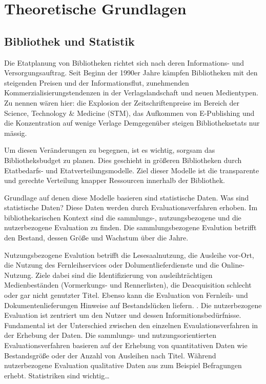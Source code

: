\chapter{Theoretische Grundlagen}
\label{chap:two}
\section{Bibliothek und Statistik}
\label{chap:two_one}
Die Etatplanung von Bibliotheken richtet sich nach deren Informations- und Versorgungsauftrag. 
Seit Beginn der 1990er Jahre kämpfen Bibliotheken mit den steigenden Preisen und der Informationsflut, 
zunehmenden Kommerzialisierungstendenzen in der Verlagslandschaft und neuen Medientypen. 
Zu nennen wären hier: die Explosion der Zeitschriftenpreise im Bereich der Science, Technology \& Medicine (STM),
das Aufkommen von E-Publishing und die Konzentration auf wenige Verlage Demgegenüber steigen Bibliotheksetats nur mässig. 
\cite[161]{moravetz-kuhlmann_monika_erwerbungspolitik_2015}

Um diesen Veränderungen zu begegnen, ist es wichtig, sorgsam das Bibliotheksbudget zu planen. 
Dies geschieht in größeren Bibliotheken durch Etatbedarfs- und Etatverteilungsmodelle. 
Ziel dieser Modelle ist die transparente und gerechte Verteilung knapper Ressourcen innerhalb der Bibliothek. 
\cite[172]{moravetz-kuhlmann_monika_erwerbungspolitik_2015}

Grundlage auf denen diese Modelle basieren sind statistische Daten. Was sind statistische Daten? Diese Daten werden durch Evaluationsverfahren erhoben. 
Im bibliothekarischen Kontext sind die sammlungs-, nutzungsbezogene und die nutzerbezogene Evaluation zu finden.  
Die sammlungsbezogene Evalution betrifft den Bestand, dessen Größe und Wachstum über die Jahre.

Nutzungsbezogene Evalution betrifft die Lesesaalnutzung, die Ausleihe vor-Ort, die Nutzung des Fernleihservices oder Dolumentlieferdienste 
und die Online-Nutzung. Ziele dabei sind die Identifizierung von ausleihträchtigen Medienbeständen (Vormerkungs- und Rennerlisten), 
die Deacquisition schlecht oder gar nicht genutzter Titel. Ebenso kann die Evaluation von Fernleih- und Dokumentenlieferungen Hinweise auf Bestandslücken liefern. 
\cite[255 ff.]{johannsen_jochen_bestands-_2015}. Die nutzerbezogene Evaluation ist zentriert um den Nutzer und dessen Informitionsbedürfnisse.
Fundamental ist der Unterschied zwischen den einzelnen Evaulationsverfahren in der Erhebung der Daten. 
Die sammlungs- und nutzungsorientierten Evaluationsverfahren basieren auf der Erhebung von quantitativen Daten wie Bestandsgröße oder der Anzahl von Ausleihen nach Titel. 
Während nutzerbezogene Evaluation qualitative Daten aus zum Beispiel Befragungen erhebt. \cite[461 ff.]{blake_data_2004}
Statistriken sind wichtig…

